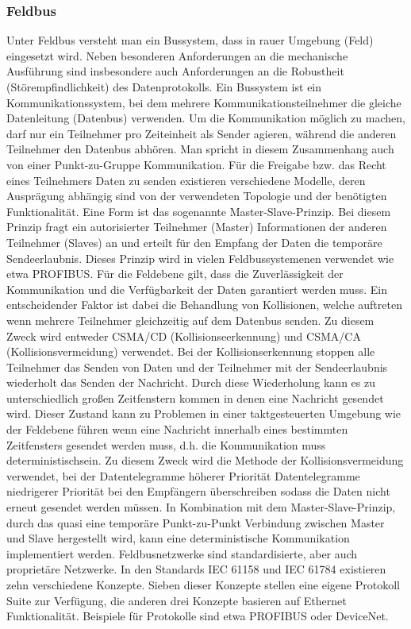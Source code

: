 
\subsubsection{Feldbus}
\glqq Unter Feldbus versteht man ein Bussystem, dass in rauer Umgebung (Feld) eingesetzt wird. Neben besonderen Anforderungen an die mechanische Ausführung sind insbesondere auch Anforderungen an die Robustheit (Störempfindlichkeit) des Datenprotokolls. \grqq \citep{Gutekunst2017} %
Ein Bussystem ist ein Kommunikationssystem, bei dem mehrere Kommunikationsteilnehmer die gleiche Datenleitung (Datenbus) verwenden. Um die Kommunikation möglich zu machen, darf nur ein Teilnehmer pro Zeiteinheit als Sender agieren, während die anderen Teilnehmer den Datenbus abhören. Man spricht in diesem Zusammenhang auch von einer Punkt-zu-Gruppe Kommunikation\citep{Gutekunst2017}. %
Für die Freigabe bzw. das Recht eines Teilnehmers Daten zu senden existieren verschiedene Modelle, deren Ausprägung abhängig sind von der verwendeten Topologie und der benötigten Funktionalität. Eine Form ist das sogenannte Master-Slave-Prinzip. Bei diesem Prinzip fragt ein autorisierter Teilnehmer (Master) Informationen der anderen Teilnehmer (Slaves) an und erteilt für den Empfang der Daten die temporäre Sendeerlaubnis. Dieses Prinzip wird in vielen Feldbussystemenen verwendet wie etwa PROFIBUS\citep{Gutekunst2017}. 
Für die Feldebene gilt, dass die Zuverlässigkeit der Kommunikation und die Verfügbarkeit der Daten garantiert werden muss. Ein entscheidender Faktor ist dabei die Behandlung von Kollisionen, welche auftreten wenn mehrere Teilnehmer gleichzeitig auf dem Datenbus senden. Zu diesem Zweck wird entweder CSMA/CD (Kollisionseerkennung) und CSMA/CA (Kollisionsvermeidung) verwendet. Bei der Kollisionserkennung stoppen alle Teilnehmer das Senden von Daten und der Teilnehmer mit der Sendeerlaubnis wiederholt das Senden der Nachricht. Durch diese Wiederholung kann es zu unterschiedlich großen Zeitfenstern kommen in denen eine Nachricht gesendet wird. Dieser Zustand kann zu Problemen in einer taktgesteuerten Umgebung wie der Feldebene führen wenn eine Nachricht innerhalb eines bestimmten Zeitfensters gesendet werden muss, d.h. die Kommunikation muss \glqq deterministisch\grqq  sein. Zu diesem Zweck wird die Methode der Kollisionsvermeidung verwendet, bei der Datentelegramme höherer Priorität Datentelegramme niedrigerer Priorität bei den Empfängern überschreiben sodass die Daten nicht erneut gesendet werden müssen. In Kombination mit dem Master-Slave-Prinzip, durch das quasi eine temporäre Punkt-zu-Punkt Verbindung zwischen Master und Slave hergestellt wird, kann eine deterministische Kommunikation implementiert werden\citep{Gutekunst2017}.
Feldbusnetzwerke sind standardisierte, aber auch proprietäre Netzwerke. In den Standards IEC 61158 und IEC 61784 existieren zehn verschiedene Konzepte. Sieben dieser Konzepte stellen eine eigene Protokoll Suite zur Verfügung, die anderen drei Konzepte basieren auf Ethernet Funktionalität. Beispiele für Protokolle sind etwa PROFIBUS oder DeviceNet.


